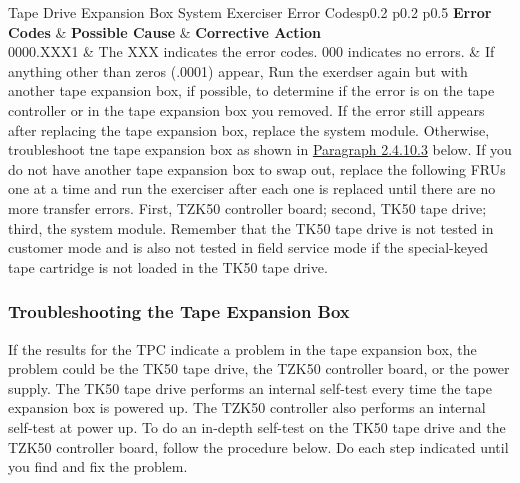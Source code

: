 \begin{tblcont}{Tape Drive Expansion Box System Exerciser Error Codes}{p{0.2\textwidth} p{0.2\textwidth} p{0.5\textwidth}}
\textbf{Error Codes} & \textbf{Possible Cause} & \textbf{Corrective Action}\\
\hline
0000.XXX1	&	The XXX indicates the error codes. 000 indicates no errors. &
	If anything other than zeros (.0001) appear, Run the exerdser again but with another tape expansion
	box, if possible, to determine if the error is on the tape controller or in the tape expansion box you
	removed. If the error still appears after replacing the tape expansion box, replace the system module.
	Otherwise, troubleshoot tne tape expansion box as shown in \hyperlink{subsubsection.2.4.10.3}{Paragraph 2.4.10.3}
	below. If you do not have another tape expansion box to swap out, replace the following FRUs one at a time and run the
	exerciser after each one is replaced until there are no more transfer errors.  First, TZK50 controller
	board; second, TK50 tape drive; third, the system module. Remember that the TK50 tape drive is not
	tested in customer mode and is also not tested in field service mode if the special-keyed tape cartridge
	is not loaded in the TK50 tape drive.
\\
\end{tblcont}

\subsubsection{Troubleshooting the Tape Expansion Box}

If the results for the TPC indicate a problem in the tape expansion box, the
problem could be the TK50 tape drive, the TZK50 controller board, or the
power supply. The TK50 tape drive performs an internal self-test every time
the tape expansion box is powered up. The TZK50 controller also performs
an internal self-test at power up. To do an in-depth self-test on the TK50
tape drive and the TZK50 controller board, follow the procedure below. Do
each step indicated until you find and fix the problem.

